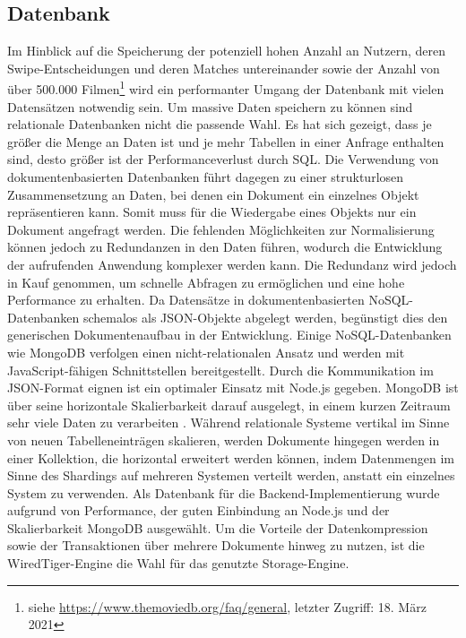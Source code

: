 \subsection{Datenbank}
Im Hinblick auf die Speicherung der potenziell hohen Anzahl an Nutzern, deren Swipe-Ent\-schei\-dungen und deren Matches untereinander sowie der Anzahl von über 500.000 Filmen\footnote{siehe \url{https://www.themoviedb.org/faq/general}, letzter Zugriff: 18. März 2021} wird ein performanter Umgang der Datenbank mit vielen Datensätzen notwendig sein.  
Um massive Daten speichern zu können sind relationale Datenbanken nicht die passende Wahl. 
Es hat sich gezeigt, dass je größer die Menge an Daten ist und je mehr Tabellen in einer Anfrage enthalten sind, desto größer ist der Performanceverlust durch SQL. \cite{4.5}
\newline
Die Verwendung von dokumentenbasierten Datenbanken führt dagegen zu einer strukturlosen Zusammensetzung an Daten, bei denen ein Dokument ein einzelnes Objekt repräsentieren kann. 
Somit muss für die Wiedergabe eines Objekts nur ein Dokument angefragt werden. Die fehlenden Möglichkeiten zur Normalisierung können jedoch zu Redundanzen in den Daten führen, wodurch die Entwicklung der aufrufenden Anwendung komplexer werden kann. 
Die Redundanz wird jedoch in Kauf genommen, um schnelle Abfragen zu ermöglichen und eine hohe Performance zu erhalten. Da Datensätze in dokumentenbasierten NoSQL-Datenbanken schemalos als JSON-Objekte abgelegt werden, begünstigt dies den generischen Dokumentenaufbau in der Entwicklung.
\newline
Einige NoSQL-Datenbanken wie MongoDB verfolgen einen nicht-relationalen Ansatz und werden mit JavaScript-fähigen Schnittstellen bereitgestellt. Durch die Kommunikation im JSON-Format eignen ist ein optimaler Einsatz mit Node.js gegeben. MongoDB ist über seine horizontale Skalierbarkeit darauf ausgelegt, in einem kurzen Zeitraum sehr viele Daten zu verarbeiten \cite{Tech6}. Während relationale Systeme vertikal im Sinne von neuen Tabelleneinträgen skalieren, werden Dokumente hingegen werden in einer Kollektion, die horizontal erweitert werden können, indem Datenmengen im Sinne des Shardings auf mehreren Systemen verteilt werden, anstatt ein einzelnes System zu verwenden.
\newline
Als Datenbank für die Backend-Implementierung wurde aufgrund von Performance, der guten Einbindung an Node.js und der Skalierbarkeit MongoDB ausgewählt. Um die Vorteile der Da\-ten\-kompression sowie der Transaktionen über mehrere Dokumente hinweg zu nutzen, ist die WiredTiger-Engine die Wahl für das genutzte Storage-Engine.  


